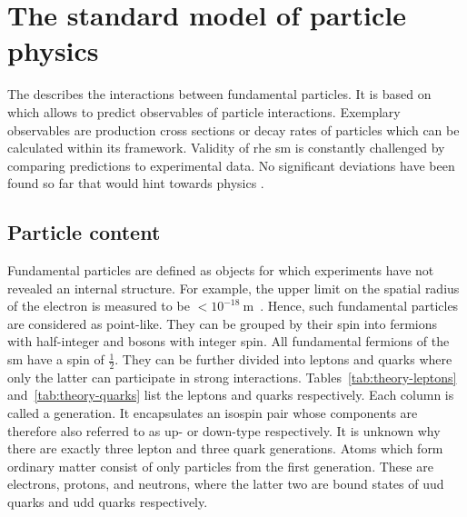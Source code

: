 \chapter{The standard model of particle physics}


The  describes the interactions between fundamental particles. It is based on  which allows to predict observables of particle interactions. Exemplary observables are production cross sections or decay rates of particles which can be calculated within its framework. Validity of rhe \gls{sm} is constantly challenged by comparing predictions to experimental data. No significant deviations have been found so far that would hint towards physics .


\section{Particle content}

Fundamental particles are defined as objects for which experiments have not revealed an internal structure. For example, the upper limit on the spatial radius of the electron is measured to be $<10^{-18}~\mathrm{m}$~\cite{PhysRevLett.97.030801}. Hence, such fundamental particles are considered as point-like. They can be grouped by their spin into fermions with half-integer and bosons with integer spin. All fundamental fermions of the \gls{sm} have a spin of $\frac{1}{2}$. They can be further divided into leptons and quarks where only the latter can participate in strong interactions. Tables~\ref{tab:theory-leptons} and~\ref{tab:theory-quarks} list the leptons and quarks respectively. Each column is called a generation. It encapsulates an isospin pair whose components are therefore also referred to as up- or down-type respectively. It is unknown why there are exactly three lepton and three quark generations. Atoms which form ordinary matter consist of only particles from the first generation. These are electrons, protons, and neutrons, where the latter two are bound states of uud quarks and udd quarks respectively.

